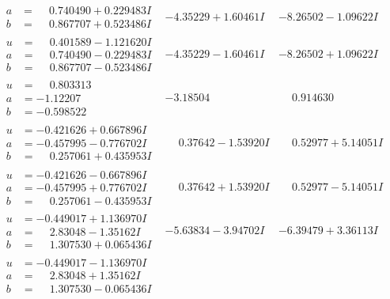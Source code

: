 \documentclass[1p]{elsarticle_modified}
\theoremstyle{definition}
\begin{document}
$$\begin{array}{c|c|c}
\begin{aligned}
a &= \phantom{-}0.740490 + 0.229483 I \\
b &= \phantom{-}0.867707 + 0.523486 I\end{aligned}
 & -4.35229 + 1.60461 I & -8.26502 - 1.09622 I \\ \hline\begin{aligned}
u &= \phantom{-}0.401589 - 1.121620 I \\
a &= \phantom{-}0.740490 - 0.229483 I \\
b &= \phantom{-}0.867707 - 0.523486 I\end{aligned}
 & -4.35229 - 1.60461 I & -8.26502 + 1.09622 I \\ \hline\begin{aligned}
u &= \phantom{-}0.803313\phantom{ +0.000000I} \\
a &= -1.12207\phantom{ +0.000000I} \\
b &= -0.598522\phantom{ +0.000000I}\end{aligned}
 & -3.18504\phantom{ +0.000000I} & \phantom{-}0.914630\phantom{ +0.000000I} \\ \hline\begin{aligned}
u &= -0.421626 + 0.667896 I \\
a &= -0.457995 - 0.776702 I \\
b &= \phantom{-}0.257061 + 0.435953 I\end{aligned}
 & \phantom{-}0.37642 - 1.53920 I & \phantom{-}0.52977 + 5.14051 I \\ \hline\begin{aligned}
u &= -0.421626 - 0.667896 I \\
a &= -0.457995 + 0.776702 I \\
b &= \phantom{-}0.257061 - 0.435953 I\end{aligned}
 & \phantom{-}0.37642 + 1.53920 I & \phantom{-}0.52977 - 5.14051 I \\ \hline\begin{aligned}
u &= -0.449017 + 1.136970 I \\
a &= \phantom{-}2.83048 - 1.35162 I \\
b &= \phantom{-}1.307530 + 0.065436 I\end{aligned}
 & -5.63834 - 3.94702 I & -6.39479 + 3.36113 I \\ \hline\begin{aligned}
u &= -0.449017 - 1.136970 I \\
a &= \phantom{-}2.83048 + 1.35162 I \\
b &= \phantom{-}1.307530 - 0.065436 I\end{aligned}

\end{array}$$
\end{document}
